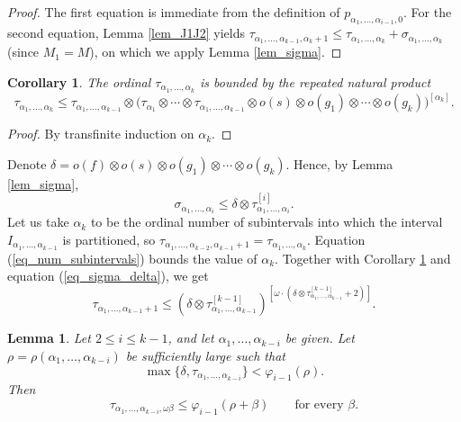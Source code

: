 \documentclass{article}
\newtheorem{Lemma}[Theorem]{Lemma}
\newtheorem{Corollary}[Theorem]{Corollary}
\theoremstyle{definition}
\begin{document}
\begin{proof}
    The first equation is immediate from the definition of $p_{\alpha_1,\ldots,\alpha_{i-1},0}$. For the second equation, Lemma \ref{lem_J1J2} yields $\tau_{\alpha_1,\ldots,\alpha_{k-1},\alpha_k+1}\le\tau_{\alpha_1,\ldots,\alpha_k}+\sigma_{\alpha_1,\ldots,\alpha_k}$ (since $M_1=M$), on which we apply Lemma \ref{lem_sigma}.
\end{proof}

\begin{Corollary}\label{cor_tau_k}
    The ordinal $\tau_{\alpha_1,\ldots,\alpha_k}$ is bounded by the repeated natural product
    \begin{equation*}
        \tau_{\alpha_1,\ldots,\alpha_k}\le \tau_{\alpha_1,\ldots,\alpha_{k-1}}\otimes\bigl(\tau_{\alpha_1}\otimes\cdots\otimes\tau_{\alpha_1,\ldots,\alpha_{k-1}}\otimes o(s)\otimes o(g_1)\otimes\cdots\otimes o(g_k)\bigr)^{[\alpha_k]}.
    \end{equation*}
\end{Corollary}

\begin{proof}
    By transfinite induction on $\alpha_k$.
\end{proof}

Denote $\delta=o(f)\otimes o(s)\otimes o(g_1)\otimes\cdots\otimes o(g_k)$. Hence, by Lemma \ref{lem_sigma},
\begin{equation}\label{eq_sigma_delta}
\sigma_{\alpha_1,\ldots,\alpha_i} \le \delta\otimes\tau_{\alpha_1,\ldots,\alpha_i}^{[i]}.
\end{equation}
Let us take $\alpha_k$ to be the ordinal number of subintervals into which the interval $I_{\alpha_1,\ldots,\alpha_{k-1}}$ is partitioned, so $\tau_{\alpha_1,\ldots,\alpha_{k-2},\alpha_{k-1}+1}=\tau_{\alpha_1,\ldots,\alpha_k}$. Equation (\ref{eq_num_subintervals}) bounds the value of $\alpha_k$. Together with Corollary \ref{cor_tau_k} and equation (\ref{eq_sigma_delta}), we get
\begin{equation}\label{eq_last_tau_plus_1}
    \tau_{\alpha_1,\ldots,\alpha_{k-1}+1}\le (\delta\otimes\tau_{\alpha_1,\ldots,\alpha_{k-1}}^{[k-1]})^{[\omega\cdot(\delta\otimes\tau_{\alpha_1,\ldots,\alpha_{k-1}}^{[k-1]}+2)]}.
\end{equation}

\begin{Lemma}\label{lem_varphi_i}
    Let $2\le i\le k-1$, and let $\alpha_1,\ldots, \alpha_{k-i}$ be given. Let $\rho=\rho(\alpha_1,\ldots,\alpha_{k-i})$ be sufficiently large such that
    \begin{equation*}
        \max{\bigl\{\delta,\tau_{\alpha_1,\ldots,\alpha_{k-i}}\bigr\}}<\varphi_{i-1}(\rho).
    \end{equation*}
    Then
    \begin{equation*}
        \tau_{\alpha_1,\ldots,\alpha_{k-i},\omega\beta}\le\varphi_{i-1}(\rho+\beta)\qquad\text{for every $\beta$.}
    \end{equation*}
\end{Lemma}
\end{document}
